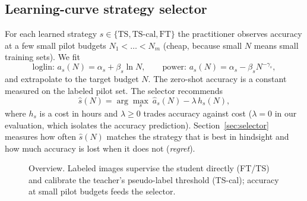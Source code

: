 \documentclass[conference]{IEEEtran}
\begin{document}
\subsection{Learning-curve strategy selector}
For each learned strategy $s\in\{\text{TS},\text{TS-cal},\text{FT}\}$ the practitioner observes accuracy at a few small pilot budgets $N_1<\dots<N_m$ (cheap, because small $N$ means small training sets). We fit
\begin{equation}
\text{loglin: } a_s(N)=\alpha_s+\beta_s\ln N,\qquad
\text{power: } a_s(N)=\alpha_s-\beta_s N^{-\gamma_s},
\end{equation}
and extrapolate to the target budget $N$. The zero-shot accuracy is a constant measured on the labeled pilot set. The selector recommends
\begin{equation}
\hat s(N)=\arg\max_{s}\ \hat a_s(N)-\lambda\, h_s(N),
\end{equation}
where $h_s$ is a cost in hours and $\lambda\ge0$ trades accuracy against cost ($\lambda=0$ in our evaluation, which isolates the accuracy prediction). Section~\ref{sec:selector} measures how often $\hat s(N)$ matches the strategy that is best in hindsight and how much accuracy is lost when it does not (\emph{regret}).

\begin{figure}[t]
\centering
{}
\caption{Overview. Labeled images supervise the student directly (FT/TS) and calibrate the teacher's pseudo-label threshold (TS-cal); accuracy at small pilot budgets feeds the selector.}
\label{fig:overview}
\end{figure}
\end{document}
